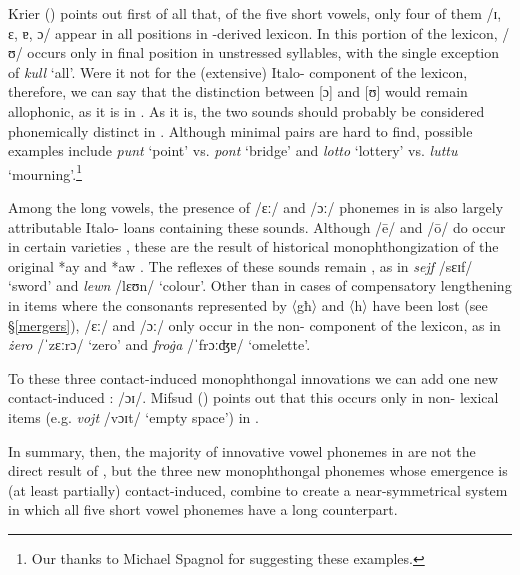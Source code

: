 \documentclass[output=paper]{langsci/langscibook}
\begin{document}
Krier (\citeyear[21]{krier1976}) points out first of all that, of the five short vowels, only four of them /ɪ, ɛ, ɐ, ɔ/ appear in all positions in -derived lexicon. In this portion of the lexicon, /ʊ/ occurs only in final position in unstressed syllables, with the single exception of \textit{kull} `all'. Were it not for the (extensive) Italo- component of the  lexicon, therefore, we can say that the distinction between [ɔ] and [ʊ] would remain allophonic, as it is in  . As it is, the two sounds should probably be considered phonemically distinct in . Although minimal pairs are hard to find, possible examples include \textit{punt} `point' vs. \textit{pont} `bridge' and \textit{lotto} `lottery' vs. \textit{luttu} `mourning'.\footnote{Our thanks to Michael Spagnol for suggesting these examples.}


Among the long vowels, the presence of /ɛː/ and /ɔː/ phonemes in  is also largely attributable Italo- loans containing these sounds. Although /\={e}/ and /\={o}/ do occur in certain   varieties \citep{Gibson2011,HerinZammit2017}, these are the result of historical monophthongization of the original *ay and *aw . The  reflexes of these sounds remain , as in \textit{sejf} /sɛɪf/ `sword' and \textit{lewn} /lɛʊn/ `colour'. Other than in cases of compensatory lengthening in items where the consonants represented by 〈għ〉 and 〈h〉 have been lost (see §\ref{mergers}), /ɛː/ and /ɔː/ only occur in the non- component of the  lexicon, as in \textit{żero} /ˈzɛːrɔ/ `zero' and \textit{froġa} /ˈfrɔːʤɐ/ `omelette'.

To these three contact-induced monophthongal innovations we can add one new contact-induced : /ɔɪ/. Mifsud (\citeyear{mifsud2011}) points out that this occurs only in non- lexical items (e.g. \textit{vojt} /vɔɪt/ `empty space') in  .

In summary, then, the majority of innovative vowel phonemes in  are not the direct result of , but the three new monophthongal phonemes whose emergence is (at least partially) contact-induced, combine to create a near-symmetrical system in which all five short vowel phonemes have a long counterpart.
\end{document}
